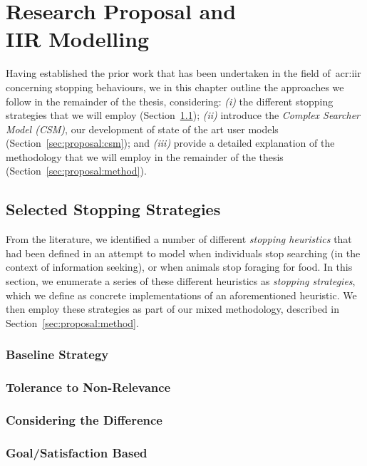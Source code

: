 
\chapter[Models and Proposal]{Research Proposal and\\IIR Modelling}\label{chap:proposal}
Having established the prior work that has been undertaken in the field of~\gls{acr:iir} concerning stopping behaviours, we in this chapter outline the approaches we follow in the remainder of the thesis, considering: \emph{(i)} the different stopping strategies that we will employ (Section~\ref{sec:proposal:strategies}); \emph{(ii)} introduce the \emph{Complex Searcher Model (CSM)}, our development of state of the art user models (Section~\ref{sec:proposal:csm}); and \emph{(iii)} provide a detailed explanation of the methodology that we will employ in the remainder of the thesis (Section~\ref{sec:proposal:method}).

\section{Selected Stopping Strategies}\label{sec:proposal:strategies}
From the literature, we identified a number of different \emph{stopping heuristics} that had been defined in an attempt to model when individuals stop searching (in the context of information seeking), or when animals stop foraging for food. In this section, we enumerate a series of these different heuristics as \emph{stopping strategies}, which we define as concrete implementations of an aforementioned heuristic. We then employ these strategies as part of our mixed methodology, described in Section~\ref{sec:proposal:method}.

\subsection{Baseline Strategy}

\subsection{Tolerance to Non-Relevance}

\subsection{Considering the Difference}

\subsection{Goal/Satisfaction Based}

